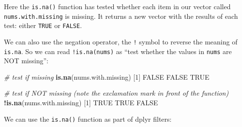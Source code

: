 \documentclass[]{article}
\newenvironment{Shaded}{\begin{snugshade}}{\end{snugshade}}
\newcommand{\CommentTok}[1]{\textcolor[rgb]{0.56,0.35,0.01}{\textit{#1}}}
\newcommand{\DecValTok}[1]{\textcolor[rgb]{0.00,0.00,0.81}{#1}}
\newcommand{\KeywordTok}[1]{\textcolor[rgb]{0.13,0.29,0.53}{\textbf{#1}}}
\newcommand{\NormalTok}[1]{#1}
\newcommand{\OperatorTok}[1]{\textcolor[rgb]{0.81,0.36,0.00}{\textbf{#1}}}
\newcommand{\OtherTok}[1]{\textcolor[rgb]{0.56,0.35,0.01}{#1}}
\newcommand{\StringTok}[1]{\textcolor[rgb]{0.31,0.60,0.02}{#1}}
\begin{document}
Here the \texttt{is.na()} function has tested whether each item in our vector called \texttt{nums.with.missing} is missing. It returns a new vector with the results of each test: either \texttt{TRUE} or \texttt{FALSE}.

We can also use the negation operator, the \texttt{!} symbol to reverse the meaning of \texttt{is.na}. So we can read \texttt{!is.na(nums)} as ``test whether the values in \texttt{nums} are NOT missing'':

\begin{Shaded}
\begin{Highlighting}[]
\CommentTok{# test if missing}
\KeywordTok{is.na}\NormalTok{(nums.with.missing)}
\NormalTok{[}\DecValTok{1}\NormalTok{] }\OtherTok{FALSE} \OtherTok{FALSE}  \OtherTok{TRUE}

\CommentTok{# test if NOT missing (note the exclamation mark in front of the function)}
\OperatorTok{!}\KeywordTok{is.na}\NormalTok{(nums.with.missing)}
\NormalTok{[}\DecValTok{1}\NormalTok{]  }\OtherTok{TRUE}  \OtherTok{TRUE} \OtherTok{FALSE}
\end{Highlighting}
\end{Shaded}

We can use the \texttt{is.na()} function as part of dplyr filters:

\begin{Shaded}
\end{Shaded}
\end{document}

